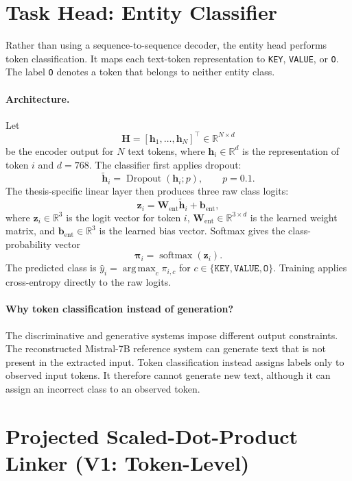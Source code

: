 \section{Task Head: Entity Classifier}
\label{sec:entity-classifier}

Rather than using a sequence-to-sequence decoder, the entity head performs
token classification. It maps each text-token representation to
\texttt{KEY}, \texttt{VALUE}, or \texttt{O}. The label \texttt{O} denotes a
token that belongs to neither entity class.

\paragraph{Architecture.}
Let
\[
  \mathbf{H}
  =[\mathbf{h}_1,\ldots,\mathbf{h}_N]^\top
  \in\mathbb{R}^{N\times d}
\]
be the encoder output for $N$ text tokens, where
$\mathbf{h}_i\in\mathbb{R}^{d}$ is the representation of token $i$ and
$d=768$. The classifier first applies dropout:
\[
  \widetilde{\mathbf{h}}_i
  =\operatorname{Dropout}(\mathbf{h}_i;p),
  \qquad p=0.1.
\]
The thesis-specific linear layer then produces three raw class logits:
\[
  \mathbf{z}_i
  =\mathbf{W}_{\mathrm{ent}}\widetilde{\mathbf{h}}_i
  +\mathbf{b}_{\mathrm{ent}},
\]
where $\mathbf{z}_i\in\mathbb{R}^{3}$ is the logit vector for token $i$,
$\mathbf{W}_{\mathrm{ent}}\in\mathbb{R}^{3\times d}$ is the learned
weight matrix, and $\mathbf{b}_{\mathrm{ent}}\in\mathbb{R}^{3}$ is the
learned bias vector. Softmax gives the class-probability vector
\[
  \boldsymbol{\pi}_i=\operatorname{softmax}(\mathbf{z}_i).
\]
The predicted class is
$\widehat{y}_i=\operatorname*{arg\,max}_{c}\pi_{i,c}$ for
$c\in\{\texttt{KEY},\texttt{VALUE},\texttt{O}\}$.
Training applies cross-entropy directly to the raw logits.

\paragraph{Why token classification instead of generation?}
The discriminative and generative systems impose different output constraints.
The reconstructed Mistral-7B reference system can generate text that is not
present in the extracted input. Token classification instead assigns labels
only to observed input tokens. It therefore cannot generate new text, although
it can assign an incorrect class to an observed token.

\section{Projected Scaled-Dot-Product Linker (V1: Token-Level)}
\label{sec:projected-linker}


